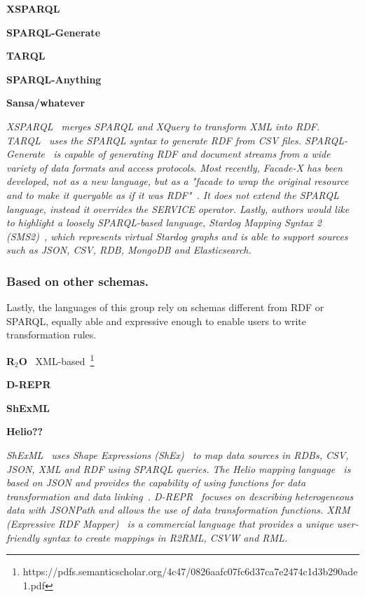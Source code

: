 \noindent\textbf{XSPARQL}~\parencite{Bischof2012xsparql}

\noindent\textbf{SPARQL-Generate}~\parencite{Lefrancois2017sparqlgenerate}

\noindent\textbf{TARQL}~\parencite{tarql}

\noindent\textbf{SPARQL-Anything}~\parencite{asprino2023sparql-anything}

\noindent\textbf{Sansa/whatever}~\parencite{stadler2023spark}




\textit{XSPARQL~\parencite{Bischof2012xsparql} merges SPARQL and XQuery to transform XML into RDF. TARQL~\parencite{tarql} uses the SPARQL syntax to generate RDF from CSV files. SPARQL-Generate~\parencite{Lefrancois2017sparqlgenerate} is capable of generating RDF and document streams from a wide variety of data formats and access protocols. Most recently, Facade-X has been developed, not as a new language, but as a "\textit{facade} to wrap the original resource and to make it queryable as if it was RDF"~\parencite{asprino2023sparql-anything}. It does not extend the SPARQL language, instead it overrides the SERVICE operator. Lastly, authors would like to highlight a loosely SPARQL-based language, Stardog Mapping Syntax 2 (SMS2)~\parencite{sms2}, which represents virtual Stardog graphs and is able to support sources such as JSON, CSV, RDB, MongoDB and Elasticsearch.}




\subsubsection{Based on other schemas.} 

Lastly, the languages of this group rely on schemas different from RDF or SPARQL, equally able and expressive enough to enable users to write transformation rules. 


\noindent\textbf{R$_2$O}~\parencite{barrasa2004r2o} XML-based~\footnote{https://pdfs.semanticscholar.org/4c47/0826aafc07fc6d37ca7e2474c1d3b290ade1.pdf}

\noindent\textbf{D-REPR}~\parencite{Vu2019d-repr}

\noindent\textbf{ShExML}~\parencite{Garcia-Gonzalez2020shexml,garcia2021shexml-challenges}

\noindent\textbf{Helio??}~\parencite{cimmino2022helio}

\textit{ShExML~\parencite{Garcia-Gonzalez2020shexml,garcia2021shexml-challenges} uses Shape Expressions (ShEx)~\parencite{prud2014shex} to map data sources in RDBs, CSV, JSON, XML and RDF using SPARQL queries. The Helio mapping language~\parencite{cimmino2022helio} is based on JSON and provides the capability of using functions for data transformation and data linking~\parencite{cimmino2018hybrid}. D-REPR~\parencite{Vu2019d-repr} focuses on describing heterogeneous data with JSONPath and allows the use of data transformation functions. XRM (Expressive RDF Mapper)~\parencite{xrm} is a commercial language that provides a unique user-friendly syntax to create mappings in R2RML, CSVW and RML.}










